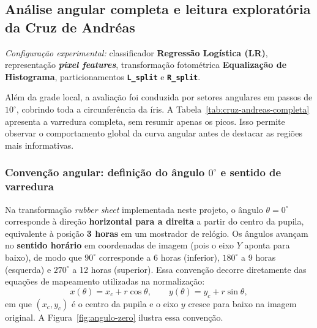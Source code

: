 \documentclass[11pt,a4paper]{article}
\begin{document}
\subsection{Análise angular completa e leitura exploratória da Cruz de Andréas}

\noindent\textit{Configuração experimental:} classificador \textbf{Regressão Logística (LR)}, representação \textbf{\textit{pixel features}}, transformação fotométrica \textbf{Equalização de Histograma}, particionamentos \textbf{\texttt{L\_split}} e \textbf{\texttt{R\_split}}.

\medskip
Além da grade local, a avaliação foi conduzida por setores angulares em passos de \(10^\circ\), cobrindo toda a circunferência da íris. A Tabela~\ref{tab:cruz-andreas-completa} apresenta a varredura completa, sem resumir apenas os picos. Isso permite observar o comportamento global da curva angular antes de destacar as regiões mais informativas.

\subsubsection{Convenção angular: definição do ângulo \texorpdfstring{$0^\circ$}{0°} e sentido de varredura}

Na transformação \textit{rubber sheet} implementada neste projeto, o ângulo \(\theta = 0^\circ\) corresponde à direção \textbf{horizontal para a direita} a partir do centro da pupila, equivalente à posição \textbf{3 horas} em um mostrador de relógio. Os ângulos avançam no \textbf{sentido horário} em coordenadas de imagem (pois o eixo \(Y\) aponta para baixo), de modo que \(90^\circ\) corresponde a 6 horas (inferior), \(180^\circ\) a 9 horas (esquerda) e \(270^\circ\) a 12 horas (superior). Essa convenção decorre diretamente das equações de mapeamento utilizadas na normalização:
\[
x(\theta) = x_c + r\cos\theta, \qquad y(\theta) = y_c + r\sin\theta,
\]
em que \((x_c, y_c)\) é o centro da pupila e o eixo \(y\) cresce para baixo na imagem original. A Figura~\ref{fig:angulo-zero} ilustra essa convenção.
\end{document}
